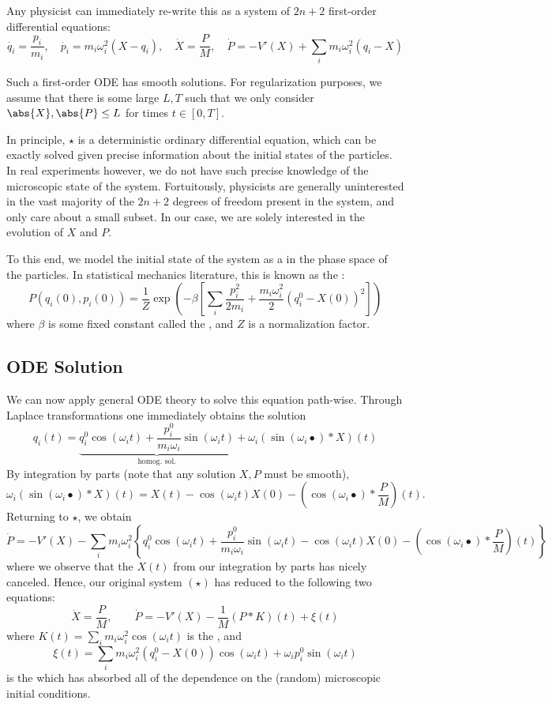 \documentclass{scrartcl}
\begin{document}
Any physicist can immediately re-write this as a system of $2n+2$ first-order differential equations:
\[
    \dot{q_i} = \frac{p_i}{m_i}, \quad \dot{p_i} = m_i\omega_i^2 (X-q_i), \quad \dot{X} = \frac{P}{M}, \quad \dot{P} = -V'(X) + \sum_i m_i\omega_i^2 (q_i-X) \tag{$\star$}
\]

Such a first-order ODE has smooth solutions. For regularization purposes, we assume that there is some large $L, T$ such that we only consider $\abs{X}, \abs{P} \leq L$ for times $t\in [0,T]$.

In principle, $\star$ is a deterministic ordinary differential equation, which can be exactly solved given precise information about the initial states of the particles. In real experiments however, we do not have such precise knowledge of the microscopic state of the system. Fortuitously, physicists are generally uninterested in the vast majority of the $2n+2$ degrees of freedom present in the system, and only care about a small subset. In our case, we are solely interested in the evolution of $X$ and $P$.

To this end, we model the initial state of the system as a  in the phase space of the particles. In statistical mechanics literature, this is known as the :
\[
    P(q_i(0), p_i(0)) = \frac{1}{Z} \exp\left(-\beta\left[
        \sum_i \frac{p_i^2}{2m_i} + \frac{m_i\omega_i^2}{2} {(q_i^0-X(0))}^2
    \right]
    \right)
\]
where $\beta$ is some fixed constant called the , and $Z$ is a normalization factor.

\subsection{ODE Solution}

We can now apply general ODE theory to solve this equation path-wise. Through Laplace transformations one immediately obtains the solution
\[
    q_i(t) = \underbrace{q_i^0 \cos(\omega_i t) + \frac{p_i^0}{m_i\omega_i} \sin(\omega_i t)}_{\text{homog.\ sol.}} + \omega_i (\sin(\omega_i \bullet ) * X)(t)
\]
By integration by parts (note that any solution $X, P$ must be smooth),
\[
    \omega_i (\sin(\omega_i \bullet ) * X)(t) = X(t) - \cos(\omega_i t)X(0) - \left(\cos(\omega_i\bullet) * \frac{P}{M}\right)(t).
\]
Returning to $\star$, we obtain
\[
    \dot P = -V'(X) - \sum_i m_i\omega_i^2 \left\{q_i^0 \cos(\omega_i t) + \frac{p_i^0}{m_i\omega_i} \sin(\omega_i t) - \cos(\omega_i t)X(0) - \left(\cos(\omega_i\bullet) * \frac{P}{M}\right)(t)\right\}
\]
where we observe that the $X(t)$ from our integration by parts has nicely canceled. Hence, our original system $(\star)$ has reduced to the following two equations:
\[
    \dot X = \frac{P}{M},\qquad \dot P = -V'(X) - \frac{1}{M} (P * K)(t) + \xi(t) \tag{$\spadesuit$}
\]
where $K(t) = \sum_i m_i\omega_i^2 \cos(\omega_i t)$ is the , and
\[
    \xi(t) = \sum_i m_i\omega_i^2(q_i^0-X(0)) \cos(\omega_i t) + \omega_i p_i^0 \sin(\omega_i t)
\]
is the  which has absorbed all of the dependence on the (random) microscopic initial conditions.
\end{document}
